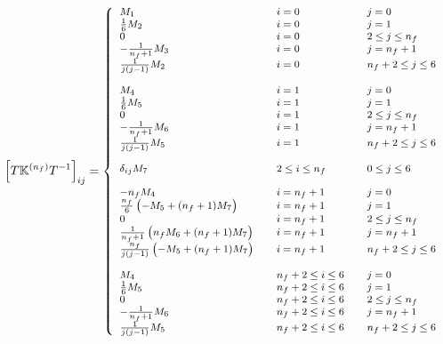 \documentclass[10pt,a4paper]{article}
\begin{document}
\begin{equation}
\footnotesize
\left[T\mathbb{K}^{(n_f)}T^{-1}\right]_{ij} =
\left\{
\begin{array}{lll}
M_1 & \quad i = 0 &\quad j = 0\\
\frac{1}{6}M_2 & \quad i = 0 &\quad  j = 1\\
0 & \quad i = 0 &\quad  2\leq j \leq n_f\\
-\frac{1}{n_f+1}M_3 & \quad i = 0 &\quad  j = n_f+1\\
\frac{1}{j(j-1)}M_2 & \quad i = 0 &\quad  n_f+ 2\leq j \leq 6\\
\\
M_4 & \quad i = 1&\quad  j=0\\
\frac16 M_5 & \quad i = 1 &\quad  j=1\\
0 & \quad i = 1 &\quad  2\leq j \leq n_f\\
-\frac{1}{n_f+1}M_6 & \quad i = 1 &\quad  j = n_f+1\\
\frac{1}{j(j-1)}M_5 & \quad i = 1 &\quad  n_f+
                                                            2\leq j
                                                            \leq 6\\
\\
\delta_{ij}M_7&\quad 2\leq i \leq n_f &\quad 0\leq j
                                                         \leq 6\\
\\
-n_fM_4 &\quad i = n_f+1 &\quad j =0\\
\frac{n_f}6\left(-M_5+(n_f+1)M_7\right) &\quad i = n_f+1 &\quad j =1\\
0 & \quad i = n_f+1 &\quad  2\leq j \leq n_f\\
\frac1{n_f+1}\left(n_f M_6+(n_f+1)M_7\right) &\quad i = n_f+1 &\quad j =n_f+1\\
\frac{n_f}{j(j-1)}\left( -M_5+(n_f+1)M_7\right) &\quad i = n_f+1
                  &\quad n_f+2 \leq j \leq 6\\
\\
M_4 & \quad n_f+2\leq i \leq 6 &\quad  j=0\\
\frac16 M_5 & \quad n_f+2\leq i \leq 6 &\quad  j=1\\
0 & \quad n_f+2\leq i \leq 6 &\quad  2\leq j \leq n_f\\
-\frac{1}{n_f+1}M_6 & \quad n_f+2\leq i \leq 6 &\quad  j = n_f+1\\
\frac{1}{j(j-1)}M_5 & \quad n_f+2\leq i \leq 6 &\quad  n_f+
                                                            2\leq j
                                                            \leq 6\\
\end{array}
\right.
\label{eq:algorithmEv}
\end{equation}
\end{document}

